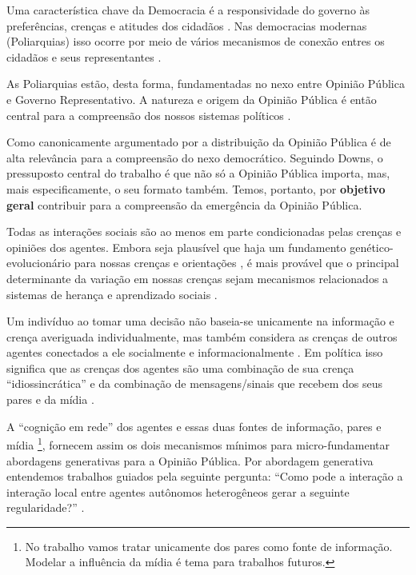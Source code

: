Uma característica chave da Democracia é a responsividade do governo às
preferências, crenças e atitudes dos cidadãos
\cite{dahl1973polyarchy,bartels2003democracy}. Nas democracias modernas
(Poliarquias) isso ocorre por meio de vários mecanismos de conexão entres os
cidadãos e seus representantes \cite{dahl1989democracy,
  schumpeter2013capitalism}.

As Poliarquias estão, desta forma, fundamentadas no nexo entre Opinião Pública e
Governo Representativo. A natureza e origem da Opinião Pública é então
central para a compreensão dos nossos sistemas políticos
\cite{berelson1952democratic}.

Como canonicamente argumentado por  a distribuição
da Opinião Pública é de alta relevância para a compreensão do nexo democrático.
Seguindo Downs, o pressuposto central do trabalho é que não só a Opinião Pública
importa, mas, mais especificamente, o seu formato também. Temos, portanto, por
\textbf{objetivo geral} contribuir para a compreensão da emergência da Opinião
Pública.

Todas as interações sociais são ao menos em parte condicionadas pelas crenças e
opiniões dos agentes. Embora seja plausível que haja um fundamento
genético-evolucionário para nossas crenças e orientações
\cite{fowler2008biology, fowler2013defense}, é mais provável que o principal
determinante da variação em  nossas crenças sejam  mecanismos relacionados a 
sistemas de herança e aprendizado sociais \cite{jablonka2014evolution}.

Um indivíduo ao tomar uma decisão não baseia-se unicamente na informação e
crença averiguada individualmente, mas também considera as crenças de outros
agentes conectados a ele socialmente e informacionalmente
\cite{gintis2016individuality}. Em política isso significa que as crenças dos
agentes são uma combinação de sua crença ``idiossincrática'' e da combinação de
mensagens/sinais que recebem dos seus pares e da mídia
\cite{barabas2004deliberation,ryan2011social}.

A ``cognição em rede'' \cite{gintis2016individuality} dos agentes e essas duas
fontes de informação, pares e mídia \footnote{No trabalho vamos tratar
  unicamente dos pares como fonte de informação. Modelar a influência da mídia é
  tema para trabalhos futuros.}, fornecem assim os dois mecanismos mínimos para
micro-fundamentar abordagens generativas para a Opinião Pública. Por abordagem
generativa entendemos trabalhos guiados pela seguinte pergunta: ``Como pode a
interação a interação local entre agentes autônomos heterogêneos gerar a
seguinte regularidade?'' \cite{epstein2006generative}.

